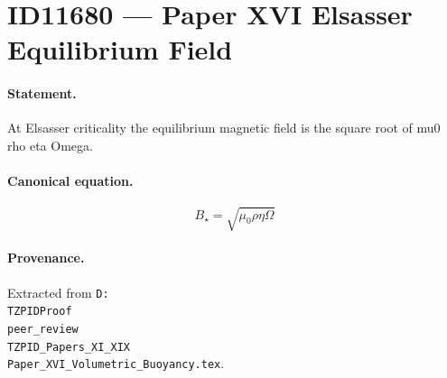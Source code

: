 \section*{ID11680 --- Paper XVI Elsasser Equilibrium Field}

\paragraph{Statement.}
At Elsasser criticality the equilibrium magnetic field is the square root of mu0 rho eta Omega.

\paragraph{Canonical equation.}
\[
B_\star=\sqrt{\mu_0\rho\eta\Omega}
\]

\paragraph{Provenance.}
Extracted from \texttt{D:\\TZPIDProof\\peer\_review\\TZPID\_Papers\_XI\_XIX\\Paper\_XVI\_Volumetric\_Buoyancy.tex}.
